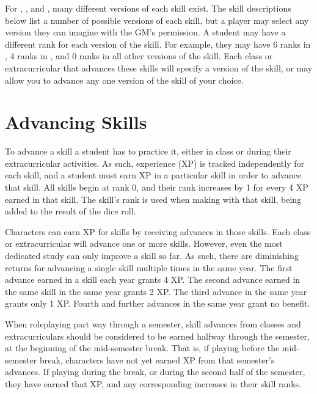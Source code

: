 For , , and , many different versions of each skill exist.
The skill descriptions below list a number of possible versions of each skill, but a player may select any version they can imagine with the GM's permission.
A student may have a different rank for each version of the skill.
For example, they may have 6 ranks in , 4 ranks in , and 0 ranks in all other versions of the skill.
Each class or extracurricular that advances these skills will specify a version of the skill, or may allow you to advance any one version of the skill of your choice.

\section{Advancing Skills}

To advance a skill a student has to practice it, either in class or during their extracurricular activities.
As such, experience (XP) is tracked independently for each skill, and a student must earn XP in a particular skill in order to advance that skill.
All skills begin at rank 0, and their rank increases by 1 for every 4 XP earned in that skill.
The skill's rank is used when making {\tests} with that skill, being added to the result of the dice roll.

Characters can earn XP for skills by receiving advances in those skills.
Each class or extracurricular will advance one or more skills.
However, even the most dedicated study can only improve a skill so far.
As such, there are diminishing returns for advancing a single skill multiple times in the same year.
The first advance earned in a skill each year grants 4 XP.
The second advance earned in the same skill in the same year grants 2 XP.
The third advance in the same year grants only 1 XP.
Fourth and further advances in the same year grant no benefit.

When roleplaying part way through a semester, skill advances from classes and extracurriculars should be considered to be earned halfway through the semester, at the beginning of the mid-semester break.
That is, if playing before the mid-semester break, characters have not yet earned XP from that semester's advances.
If playing during the break, or during the second half of the semester, they have earned that XP, and any corresponding increases in their skill ranks.

